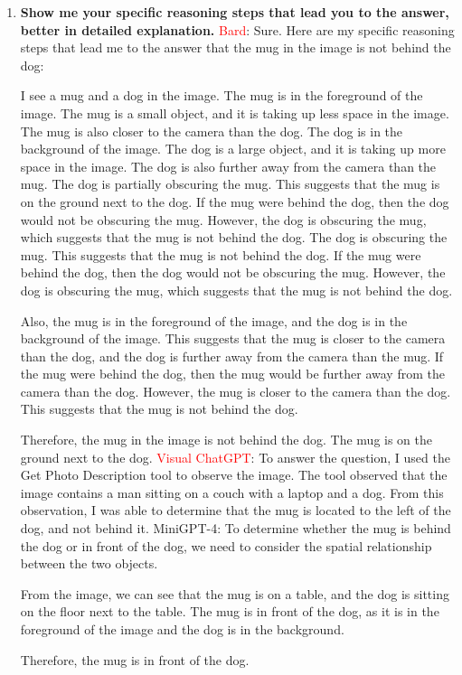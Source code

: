 \begin{enumerate}
    Therefore, the mug in the image is not behind the dog. The mug is on the ground next to the dog.
    \subitem \textcolor{red}{Visual ChatGPT}: The mug is located to the left of the dog, not behind it.
    \subitem MiniGPT-4: No, the mug is not behind the dog. It is in front of the dog, on a table in front of the dog.
    \item \textbf{Show me your specific reasoning steps that lead you to the answer, better in detailed explanation.}
    \subitem \textcolor{Red}{Bard}: 
    Sure. Here are my specific reasoning steps that lead me to the answer that the mug in the image is not behind the dog:
    
    I see a mug and a dog in the image.
    The mug is in the foreground of the image. The mug is a small object, and it is taking up less space in the image. The mug is also closer to the camera than the dog.
    The dog is in the background of the image. The dog is a large object, and it is taking up more space in the image. The dog is also further away from the camera than the mug.
    The dog is partially obscuring the mug. This suggests that the mug is on the ground next to the dog.
    If the mug were behind the dog, then the dog would not be obscuring the mug. However, the dog is obscuring the mug, which suggests that the mug is not behind the dog.
    The dog is obscuring the mug. This suggests that the mug is not behind the dog. If the mug were behind the dog, then the dog would not be obscuring the mug. However, the dog is obscuring the mug, which suggests that the mug is not behind the dog.
    
    Also, the mug is in the foreground of the image, and the dog is in the background of the image. This suggests that the mug is closer to the camera than the dog, and the dog is further away from the camera than the mug. If the mug were behind the dog, then the mug would be further away from the camera than the dog. However, the mug is closer to the camera than the dog. This suggests that the mug is not behind the dog.
    
    Therefore, the mug in the image is not behind the dog. The mug is on the ground next to the dog.
    \subitem \textcolor{red}{Visual ChatGPT}: To answer the question, I used the Get Photo Description tool to observe the image. The tool observed that the image contains a man sitting on a couch with a laptop and a dog. From this observation, I was able to determine that the mug is located to the left of the dog, and not behind it.
    \subitem MiniGPT-4: To determine whether the mug is behind the dog or in front of the dog, we need to consider the spatial relationship between the two objects.

    From the image, we can see that the mug is on a table, and the dog is sitting on the floor next to the table. The mug is in front of the dog, as it is in the foreground of the image and the dog is in the background.
    
    Therefore, the mug is in front of the dog.
\end{enumerate}
